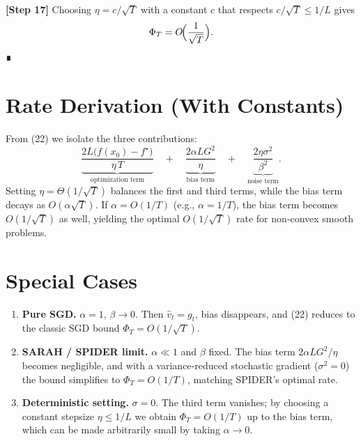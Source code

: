 \documentclass{article}
\begin{document}
\noindent\textbf{[Step 17]} Choosing $\eta = c/\sqrt{T}$ with a constant $c$ that respects $c/\sqrt{T}\le 1/L$ gives
\[
\Phi_{T}=O\!\Bigl(\frac{1}{\sqrt{T}}\Bigr).
\]
∎

\section*{Rate Derivation (With Constants)}
From (22) we isolate the three contributions:
\[
\underbrace{\frac{2L\bigl(f(x_{0})-f^{\star}\bigr)}{\eta\,T}}_{\text{optimization term}}
\quad+\quad
\underbrace{\frac{2\alpha L G^{2}}{\eta}}_{\text{bias term}}
\quad+\quad
\underbrace{\frac{2\eta\sigma^{2}}{\beta^{2}}}_{\text{noise term}} .
\]
Setting $\eta = \Theta(1/\sqrt{T})$ balances the first and third terms, while the bias term decays as $O(\alpha\sqrt{T})$. If $\alpha = O(1/T)$ (e.g., $\alpha = 1/T$), the bias term becomes $O(1/\sqrt{T})$ as well, yielding the optimal $O(1/\sqrt{T})$ rate for non‑convex smooth problems.

\section*{Special Cases}
\begin{enumerate}
\item \textbf{Pure SGD.} $\alpha=1$, $\beta\to0$. Then $\hat v_{t}=g_{t}$, bias disappears, and (22) reduces to the classic SGD bound $\Phi_{T}=O(1/\sqrt{T})$.
\item \textbf{SARAH / SPIDER limit.} $\alpha\ll1$ and $\beta$ fixed. The bias term $2\alpha LG^{2}/\eta$ becomes negligible, and with a variance‑reduced stochastic gradient ($\sigma^{2}=0$) the bound simplifies to $\Phi_{T}=O(1/T)$, matching SPIDER’s optimal rate.
\item \textbf{Deterministic setting.} $\sigma=0$. The third term vanishes; by choosing a constant stepsize $\eta\le 1/L$ we obtain $\Phi_{T}=O(1/T)$ up to the bias term, which can be made arbitrarily small by taking $\alpha\to0$.
\end{enumerate}
\end{document}
